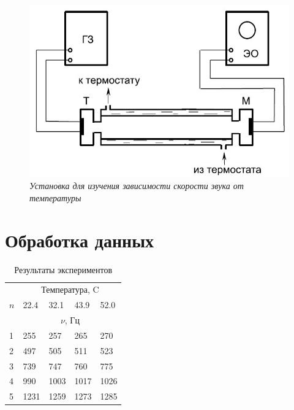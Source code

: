 \documentclass{article}
\begin{document}
\newpage

\begin{figure}[h!]
	\begin{center}
		\includegraphics[width=12cm]{ust2.jpg}
	\end{center}
	\caption{\textit{Установка для изучения зависимости скорости звука от температуры}}
	\label{img2}
\end{figure}

\section*{Обработка данных}

\begin{table}[h!]
	\centering
	\begin{tabular}{|lllll|}
		\hline
		\multicolumn{1}{|c|}{}    & \multicolumn{4}{|c|}{Температура, C}                                                                \\ \cline{2-5}
		\multicolumn{1}{|c|}{$n$} & \multicolumn{1}{l|}{22.4}            & \multicolumn{1}{l|}{32.1} & \multicolumn{1}{l|}{43.9} & 52.0 \\ \cline{2-5}
		\multicolumn{1}{|c|}{}    & \multicolumn{4}{c|}{$\nu$, Гц}                                                                      \\ \hline
		\multicolumn{1}{|l|}{1}   & \multicolumn{1}{l|}{255}             & \multicolumn{1}{l|}{257}  & \multicolumn{1}{l|}{265}  & 270  \\ \hline
		\multicolumn{1}{|l|}{2}   & \multicolumn{1}{l|}{497}             & \multicolumn{1}{l|}{505}  & \multicolumn{1}{l|}{511}  & 523  \\ \hline
		\multicolumn{1}{|l|}{3}   & \multicolumn{1}{l|}{739}             & \multicolumn{1}{l|}{747}  & \multicolumn{1}{l|}{760}  & 775  \\ \hline
		\multicolumn{1}{|l|}{4}   & \multicolumn{1}{l|}{990}             & \multicolumn{1}{l|}{1003} & \multicolumn{1}{l|}{1017} & 1026 \\ \hline
		\multicolumn{1}{|l|}{5}   & \multicolumn{1}{l|}{1231}            & \multicolumn{1}{l|}{1259} & \multicolumn{1}{l|}{1273} & 1285 \\ \hline
	\end{tabular}
	\caption{Результаты экспериментов}
\end{table}
\end{document}
